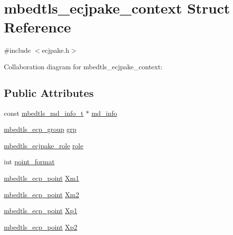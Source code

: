 \hypertarget{structmbedtls__ecjpake__context}{}\section{mbedtls\+\_\+ecjpake\+\_\+context Struct Reference}
\label{structmbedtls__ecjpake__context}


{\ttfamily \#include $<$ecjpake.\+h$>$}



Collaboration diagram for mbedtls\+\_\+ecjpake\+\_\+context\+:
\subsection*{Public Attributes}
\begin{DoxyCompactItemize}
\item 
const \mbox{\hyperlink{structmbedtls__md__info__t}{mbedtls\+\_\+md\+\_\+info\+\_\+t}} $\ast$ \mbox{\hyperlink{structmbedtls__ecjpake__context_a2c8920999ae02d5742f4dcfd0a36e02c}{md\+\_\+info}}
\item 
\mbox{\hyperlink{structmbedtls__ecp__group}{mbedtls\+\_\+ecp\+\_\+group}} \mbox{\hyperlink{structmbedtls__ecjpake__context_ac2604256267f50b4bd75f17655c6299a}{grp}}
\item 
\mbox{\hyperlink{ecjpake_8h_a3f1fa77b9cda6a2540b9bd6b84fb9f3f}{mbedtls\+\_\+ecjpake\+\_\+role}} \mbox{\hyperlink{structmbedtls__ecjpake__context_a50dc89b5a0871cdee0e1e78d5848b364}{role}}
\item 
int \mbox{\hyperlink{structmbedtls__ecjpake__context_acf904eb3228525b6b74117b2c9686fd3}{point\+\_\+format}}
\item 
\mbox{\hyperlink{structmbedtls__ecp__point}{mbedtls\+\_\+ecp\+\_\+point}} \mbox{\hyperlink{structmbedtls__ecjpake__context_af48836057581977acd52e7bf079a3368}{Xm1}}
\item 
\mbox{\hyperlink{structmbedtls__ecp__point}{mbedtls\+\_\+ecp\+\_\+point}} \mbox{\hyperlink{structmbedtls__ecjpake__context_a55676584cea41d167008b594748ca0d5}{Xm2}}
\item 
\mbox{\hyperlink{structmbedtls__ecp__point}{mbedtls\+\_\+ecp\+\_\+point}} \mbox{\hyperlink{structmbedtls__ecjpake__context_a3278c6093f4ef2bfd90984fc3d4cf773}{Xp1}}
\item 
\mbox{\hyperlink{structmbedtls__ecp__point}{mbedtls\+\_\+ecp\+\_\+point}} \mbox{\hyperlink{structmbedtls__ecjpake__context_a586f1c91152f57b4398b5e9711b93c46}{Xp2}}
\item 

\end{DoxyCompactItemize}
